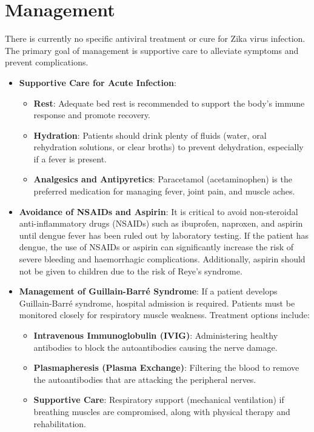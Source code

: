 \section*{Management}
There is currently no specific antiviral treatment or cure for Zika virus infection. The primary goal of management is supportive care to alleviate symptoms and prevent complications.
\begin{itemize}
\item \textbf{Supportive Care for Acute Infection}:
  \begin{itemize}
  \item \textbf{Rest}: Adequate bed rest is recommended to support the body's immune response and promote recovery.
  \item \textbf{Hydration}: Patients should drink plenty of fluids (water, oral rehydration solutions, or clear broths) to prevent dehydration, especially if a fever is present.
  \item \textbf{Analgesics and Antipyretics}: Paracetamol (acetaminophen) is the preferred medication for managing fever, joint pain, and muscle aches.
  \end{itemize}
\item \textbf{Avoidance of NSAIDs and Aspirin}: It is critical to avoid non-steroidal anti-inflammatory drugs (NSAIDs) such as ibuprofen, naproxen, and aspirin until dengue fever has been ruled out by laboratory testing. If the patient has dengue, the use of NSAIDs or aspirin can significantly increase the risk of severe bleeding and haemorrhagic complications. Additionally, aspirin should not be given to children due to the risk of Reye's syndrome.
\item \textbf{Management of Guillain-Barr\'e Syndrome}: If a patient develops Guillain-Barr\'e syndrome, hospital admission is required. Patients must be monitored closely for respiratory muscle weakness. Treatment options include:
  \begin{itemize}
  \item \textbf{Intravenous Immunoglobulin (IVIG)}: Administering healthy antibodies to block the autoantibodies causing the nerve damage.
  \item \textbf{Plasmapheresis (Plasma Exchange)}: Filtering the blood to remove the autoantibodies that are attacking the peripheral nerves.
  \item \textbf{Supportive Care}: Respiratory support (mechanical ventilation) if breathing muscles are compromised, along with physical therapy and rehabilitation.
  \end{itemize}

\end{itemize}
